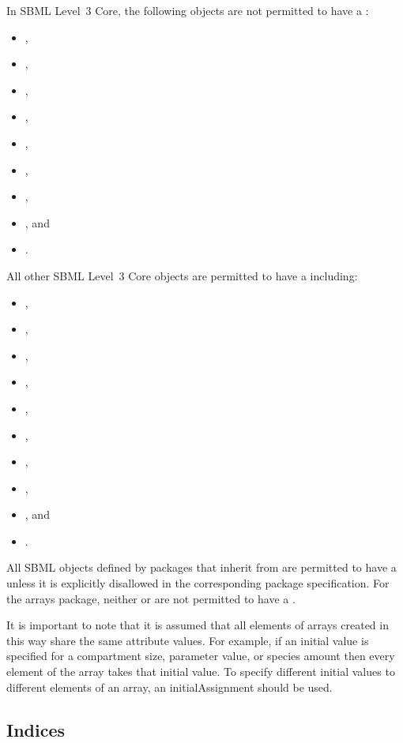 In SBML Level~3 Core, the following objects are not permitted to have a \ListOfDimensions:
\begin{itemize}
\item {}, 
\item {}, 
\item {}, 
\item {}, 
\item {}, 
\item {}, 
\item {}, 
\item {}, and 
\item {}.
\end{itemize}
All other SBML Level~3 Core objects are permitted to have a \ListOfDimensions including:
\begin{itemize}
\item {},
\item {},
\item {},
\item {},
\item {},
\item {},
\item {},
\item {},
\item {}, and
\item {}.  
\end{itemize}
All SBML objects defined by packages that inherit from \SBase are permitted to have a \ListOfDimensions unless it is explicitly disallowed in the corresponding package specification.  For the arrays package, neither \Dimension or \Index are not permitted to have a \ListOfDimensions.

It is important to note that it is assumed that all elements of arrays created in this way share the same attribute values.  For example, if an initial value is specified for a compartment size, parameter value, or species amount then every element of the array takes that initial value.  To specify different initial values to different elements of an array, an initialAssignment should be used. 

\subsection{Indices}
\label{sec:index}

